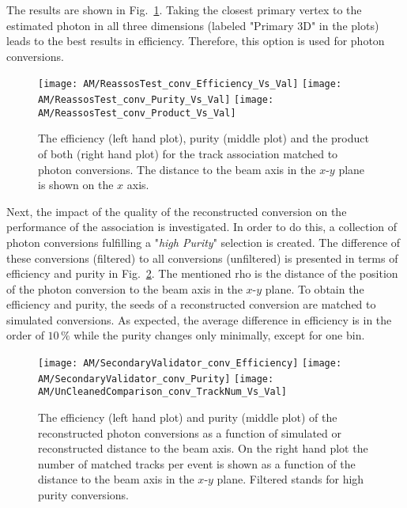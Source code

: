 The results are shown in Fig.~\ref{plot:AMWFSVpcEffAndPurSO}. Taking the closest primary vertex to the estimated photon in all three dimensions (labeled "Primary 3D" in the plots) leads to the best results in efficiency. Therefore, this option is used for photon conversions.

\begin{figure}[!ht]
    \centering
    \texttt{[image: AM/ReassosTest\_conv\_Efficiency\_Vs\_Val]}
    \texttt{[image: AM/ReassosTest\_conv\_Purity\_Vs\_Val]}
    \texttt{[image: AM/ReassosTest\_conv\_Product\_Vs\_Val]}
    \caption[Efficiency, purity and their product of the association with photon conversions for different search options as a function of distance to the beam axis]{The efficiency (left hand plot), purity (middle plot) and the product of both (right hand plot) for the track association matched to photon conversions. The distance to the beam axis in the $x$-$y$ plane is shown on the $x$ axis.\label{plot:AMWFSVpcEffAndPurSO}}
\end{figure}

Next, the impact of the quality of the reconstructed conversion on the performance of the association is investigated. In order to do this, a collection of photon conversions fulfilling a "\textit{high Purity}" selection is created. The difference of these conversions (filtered) to all conversions (unfiltered) is presented in terms of efficiency and purity in Fig.~\ref{plot:AMWFSVpcEffAndPurDC}. The mentioned rho is the distance of the position of the photon conversion to the beam axis in the $x$-$y$ plane.  To obtain the efficiency and purity, the seeds of a reconstructed conversion are matched to simulated conversions. As expected, the average difference in efficiency is in the order of $10\,\%$ while the purity changes only minimally, except for one bin.

\begin{figure}[!ht]
    \centering
    \texttt{[image: AM/SecondaryValidator\_conv\_Efficiency]}
    \texttt{[image: AM/SecondaryValidator\_conv\_Purity]}
    \texttt{[image: AM/UnCleanedComparison\_conv\_TrackNum\_Vs\_Val]}
    \caption[Purity and efficiency of the reconstructed photon conversions as a function of distance to the beam axis and number of matched tracks]{The efficiency (left hand plot) and purity (middle plot) of the reconstructed photon conversions as a function of simulated or reconstructed distance to the beam axis. On the right hand plot the number of matched tracks per event is shown as a function of  the distance to the beam axis in the $x$-$y$ plane. Filtered stands for high purity conversions. \label{plot:AMWFSVpcEffAndPurDC}}
\end{figure}

